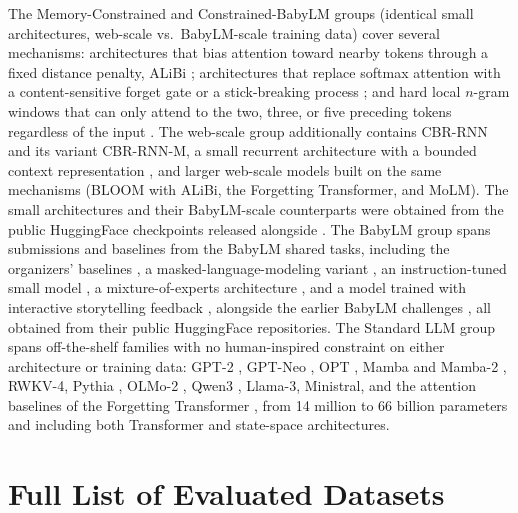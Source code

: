 The Memory-Constrained and Constrained-BabyLM groups (identical small architectures, web-scale vs.\ BabyLM-scale training data) cover several mechanisms: architectures that bias attention toward nearby tokens through a fixed distance penalty, ALiBi \citep{press2021train,devarda2024locally,clark2025linear}; architectures that replace softmax attention with a content-sensitive forget gate \citep{lin2025forgetting} or a stick-breaking process \citep{tan2025scaling}; and hard local $n$-gram windows that can only attend to the two, three, or five preceding tokens regardless of the input \citep{bu2026staticlinearattentionconstraints}. The web-scale group additionally contains CBR-RNN and its variant CBR-RNN-M, a small recurrent architecture with a bounded context representation \citep{timkey2023limited}, and larger web-scale models built on the same mechanisms (BLOOM with ALiBi, the Forgetting Transformer, and MoLM). The small architectures and their BabyLM-scale counterparts were obtained from the public HuggingFace checkpoints released alongside \citet{bu2026staticlinearattentionconstraints}. The BabyLM group spans submissions and baselines from the BabyLM shared tasks, including the organizers' baselines \citep{charpentier2025findings}, a masked-language-modeling variant \citep{edman2025mask}, an instruction-tuned small model \citep{capone2025classit}, a mixture-of-experts architecture \citep{tapaninaho2025moep}, and a model trained with interactive storytelling feedback \citep{martins2025upon}, alongside the earlier BabyLM challenges \citep{warstadt2023cfp,warstadt2023findings,hu2024secondbabylm}, all obtained from their public HuggingFace repositories. The Standard LLM group spans off-the-shelf families with no human-inspired constraint on either architecture or training data: GPT-2 \citep{radford2019gpt2}, GPT-Neo \citep{black2021gptneo}, OPT \citep{zhang2022opt}, Mamba and Mamba-2 \citep{gu2024mamba}, RWKV-4, Pythia \citep{biderman2023pythia}, OLMo-2 \citep{olmo20252olmo2furious}, Qwen3 \citep{qwen3}, Llama-3, Ministral, and the attention baselines of the Forgetting Transformer \citep{lin2025forgetting}, from 14 million to 66 billion parameters and including both Transformer and state-space architectures.



\section{Full List of Evaluated Datasets}
\label{app:datasets}

